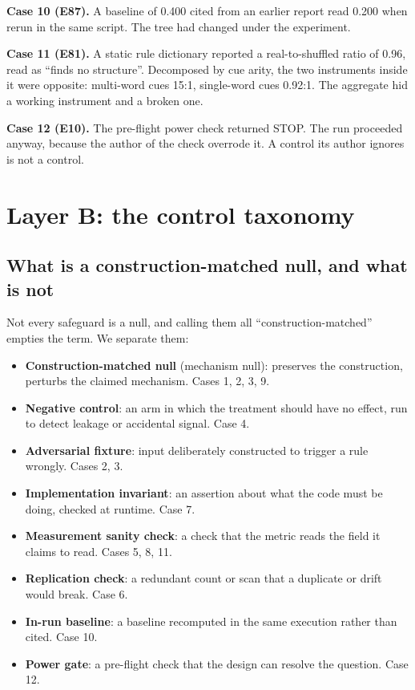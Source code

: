 \documentclass[11pt]{article}
\begin{document}
\textbf{Case 10 (E87).} A baseline of 0.400 cited from an earlier report
read 0.200 when rerun in the same script. The tree had changed under the
experiment.

\textbf{Case 11 (E81).} A static rule dictionary reported a real-to-shuffled
ratio of 0.96, read as ``finds no structure''. Decomposed by cue arity, the
two instruments inside it were opposite: multi-word cues 15:1,
single-word cues 0.92:1. The aggregate hid a working instrument and a
broken one.

\textbf{Case 12 (E10).} The pre-flight power check returned STOP. The run
proceeded anyway, because the author of the check overrode it. A control
its author ignores is not a control.

\section{Layer B: the control taxonomy}
\label{sec:taxonomy}

\subsection{What is a construction-matched null, and what is not}

Not every safeguard is a null, and calling them all ``construction-matched''
empties the term. We separate them:

\begin{itemize}
\item \textbf{Construction-matched null} (mechanism null): preserves the
  construction, perturbs the claimed mechanism. Cases 1, 2, 3, 9.
\item \textbf{Negative control}: an arm in which the treatment should have
  no effect, run to detect leakage or accidental signal. Case 4.
\item \textbf{Adversarial fixture}: input deliberately constructed to
  trigger a rule wrongly. Cases 2, 3.
\item \textbf{Implementation invariant}: an assertion about what the code
  must be doing, checked at runtime. Case 7.
\item \textbf{Measurement sanity check}: a check that the metric reads the
  field it claims to read. Cases 5, 8, 11.
\item \textbf{Replication check}: a redundant count or scan that a
  duplicate or drift would break. Case 6.
\item \textbf{In-run baseline}: a baseline recomputed in the same
  execution rather than cited. Case 10.
\item \textbf{Power gate}: a pre-flight check that the design can resolve
  the question. Case 12.
\end{itemize}
\end{document}
